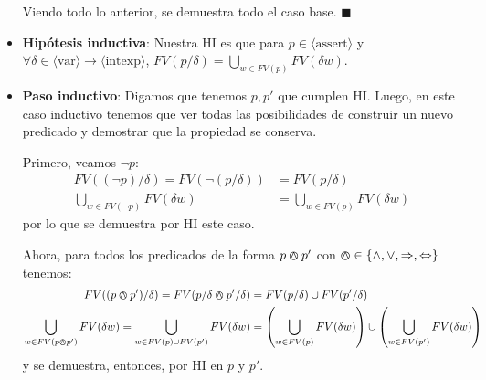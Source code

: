 \documentclass{article}
\newcommand{\aexp}[1]{\langle\text{#1}\rangle}
\newcommand{\intexp}{\aexp{intexp}}
\newcommand{\var}{\aexp{var}}
\newcommand{\assert}{\aexp{assert}}
\begin{document}
\begin{itemize}
	      Viendo todo lo anterior, se demuestra todo el caso base. $\blacksquare$

	\item \textbf{Hipótesis inductiva}: Nuestra HI es que para $p \in \assert$ y $\forall \delta \in \var \to \intexp$, $FV(p/\delta) = \bigcup_{w \in FV(p)} FV(\delta w)$.

	\item \textbf{Paso inductivo}: Digamos que tenemos $p, p'$ que cumplen HI.
	      Luego, en este caso inductivo tenemos que ver todas las posibilidades de construir un nuevo predicado y demostrar que la propiedad se conserva.

	      Primero, veamos $\neg p$:
	      \begin{equation*}
		      \begin{aligned}
			      FV((\neg p)/\delta) = FV(\neg (p/\delta)) & = FV(p/\delta)                       \\
			      \bigcup_{w \in FV(\neg p)} FV(\delta w)   & = \bigcup_{w \in FV(p)} FV(\delta w)
		      \end{aligned}
	      \end{equation*}
	      por lo que se demuestra por HI este caso.

	      Ahora, para todos los predicados de la forma $p \varowedge p'$ con $\varowedge \in \{\land, \lor, \Rightarrow, \Leftrightarrow\}$ tenemos:
	      \begin{equation*}
		      \begin{aligned}
			      FV((p \varowedge p')/\delta) = FV(p/\delta \varowedge p'/\delta)                                  & = FV(p/\delta) \cup FV(p'/\delta)                                                                           \\
			      \bigcup_{w \in FV(p \varowedge p')} FV(\delta w) = \bigcup_{w \in FV(p) \cup FV(p')} FV(\delta w) & = \left( \bigcup_{w \in FV(p)} FV(\delta w) \right) \cup \left( \bigcup_{w \in FV(p')} FV(\delta w) \right)
		      \end{aligned}
	      \end{equation*}
	      y se demuestra, entonces, por HI en $p$ y $p'$.


\end{itemize}
\end{document}
